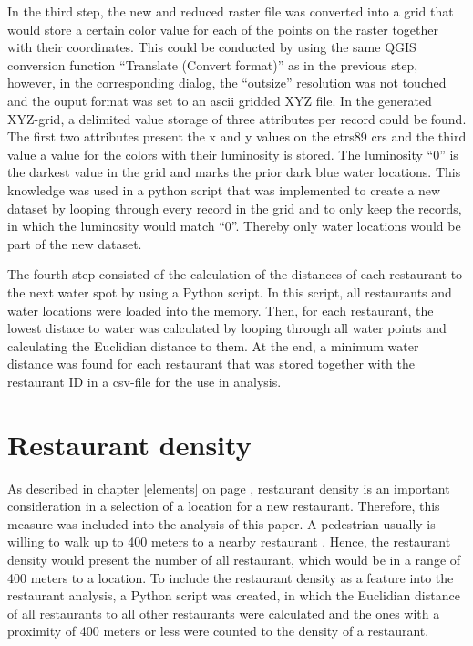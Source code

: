 \documentclass[a4paper, 11pt, oneside]{Thesis}  %
\begin{document}
In the third step, the new and reduced raster file was converted into a grid that would store a certain color value for each of the points on the raster together with their coordinates. This could be conducted by using the same QGIS conversion function ``Translate (Convert format)'' as in the previous step, however, in the corresponding dialog, the ``outsize'' resolution was not touched and the ouput format was set to an \ac{ascii} gridded XYZ file. In the generated XYZ-grid, a delimited value storage of three attributes per record could be found. The first two attributes present the x and y values on the \ac{etrs89} \ac{crs} and the third value a value for the colors with their luminosity is stored. The luminosity ``0'' is the darkest value in the grid and marks the prior dark blue water locations. This knowledge was used in a python script that was implemented to create a new dataset by looping through every record in the grid and to only keep the records, in which the luminosity would match ``0''. Thereby only water locations would be part of the new dataset.

The fourth step consisted of the calculation of the distances of each restaurant to the next water spot by using a Python script. In this script, all restaurants and water locations were loaded into the memory. Then, for each restaurant, the lowest distace to water was calculated by looping through all water points and calculating the Euclidian distance to them. At the end, a minimum water distance was found for each restaurant that was stored together with the restaurant ID in a \ac{csv}-file for the use in analysis.

\section{Restaurant density}
\label{restaurant_density}

As described in chapter \ref{elements} on page \pageref{elements}, restaurant density is an important consideration in a selection of a location for a new restaurant. Therefore, this measure was included into the analysis of this paper. A pedestrian usually is willing to walk up to 400 meters to a nearby restaurant \cite{Yang.2012b}. Hence, the restaurant density would present the number of all restaurant, which would be in a range of 400 meters to a location. To include the restaurant density as a feature into the restaurant analysis, a Python script was created, in which the Euclidian distance of all  restaurants to all other restaurants were calculated and the ones with a proximity of 400 meters or less were counted to the density of a restaurant.
\end{document}
